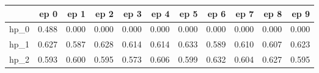 \begin{tabular}{lrrrrrrrrrr}
\toprule
{} &   ep 0 &   ep 1 &   ep 2 &   ep 3 &   ep 4 &   ep 5 &   ep 6 &   ep 7 &   ep 8 &   ep 9 \\
\midrule
hp\_0 &  0.488 &  0.000 &  0.000 &  0.000 &  0.000 &  0.000 &  0.000 &  0.000 &  0.000 &  0.000 \\
hp\_1 &  0.627 &  0.587 &  0.628 &  0.614 &  0.614 &  0.633 &  0.589 &  0.610 &  0.607 &  0.623 \\
hp\_2 &  0.593 &  0.600 &  0.595 &  0.573 &  0.606 &  0.599 &  0.632 &  0.604 &  0.627 &  0.595 \\
\bottomrule
\end{tabular}
